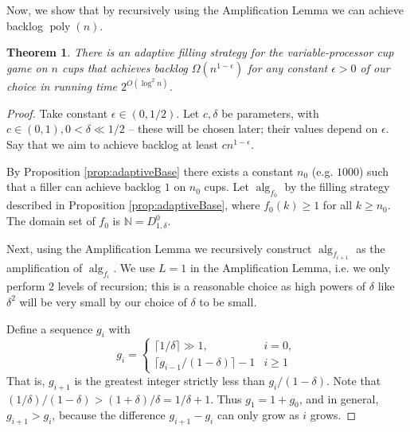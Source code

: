 \documentclass[twocolumn]{article}[10pt]
\DeclareMathOperator{\poly}{\text{poly}}
\DeclareMathOperator{\alg}{\text{alg}}
\newtheorem{theorem}{Theorem}
\begin{document}
Now, we show that by recursively using the Amplification Lemma we
can achieve backlog $\poly(n)$.
\begin{theorem}
  \label{thm:adaptivePoly}
  There is an adaptive filling strategy for the variable-processor cup game on
  $n$ cups that achieves backlog $\Omega(n^{1-\epsilon})$ for any constant
  $\epsilon > 0$ of our choice in running time $2^{O(\log^2 n)}$.
\end{theorem}
\begin{proof}
  Take constant $\epsilon \in (0,1/2)$. Let $c, \delta$ be
  parameters, with $c\in (0,1), 0 < \delta \ll 1/2$ -- these will
  be chosen later; their values depend on $\epsilon$.
  Say that we aim to achieve backlog at least $cn^{1-\epsilon}$.

  By Proposition \ref{prop:adaptiveBase} there exists a constant
  $n_0$ (e.g. $1000$) such that a filler can achieve backlog $1$
  on $n_0$ cups. Let $\alg_{f_0}$ by the filling strategy
  described in Proposition \ref{prop:adaptiveBase}, where $f_0(k)
  \ge 1$ for all $k\ge n_0$. The domain set of $f_0$ is
  $\mathbb{N} = D^0_{1, \delta}$.

  Next, using the Amplification Lemma we recursively construct
  $\alg_{f_{i+1}}$ as the amplification of $\alg_{f_{i}}$. 
  We use $L=1$ in the Amplification
  Lemma, i.e. we only perform $2$ levels of recursion; this is a
  reasonable choice as high powers of $\delta$ like $\delta^2$
  will be very small by our choice of $\delta$ to be small. 

  Define a sequence $g_i$ with 
  $$ g_i = \begin{cases}
    \lceil 1/\delta \rceil \gg 1,  & i = 0,\\
    \lceil g_{i-1}/(1-\delta)\rceil -1 & i  \ge 1
  \end{cases} $$
  That is, $g_{i+1}$ is the greatest integer strictly less than
  $g_i/(1-\delta)$.
  Note that $ (1/\delta) / (1-\delta) > (1+\delta)/\delta = 1/\delta + 1.$
  Thus $g_1 = 1+ g_0$, and in general, $g_{i+1} > g_i$, because the difference
  $g_{i+1}-g_i$ can only grow as $i$ grows.


\end{proof}
\end{document}
